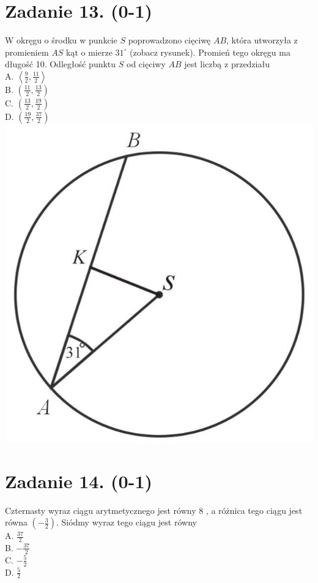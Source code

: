 \documentclass[10pt]{article}
\begin{document}
\section*{Zadanie 13. (0-1)}
W okręgu o środku w punkcie \(S\) poprowadzono cięciwę \(A B\), która utworzyła z promieniem \(A S\) kąt o mierze \(31^{\circ}\) (zobacz rysunek). Promień tego okręgu ma długość 10. Odległość punktu \(S\) od cięciwy \(A B\) jest liczbą z przedziału\\
A. \(\left\langle\frac{9}{2}, \frac{11}{2}\right\rangle\)\\
B. \(\left(\frac{11}{2}, \frac{13}{2}\right)\)\\
C. \(\left(\frac{13}{2}, \frac{19}{2}\right)\)\\
D. \(\left(\frac{19}{2}, \frac{37}{2}\right)\)\\
\includegraphics[max width=\textwidth, center]{2024_11_21_1c92fcc0db78c9202015g-06}

\section*{Zadanie 14. (0-1)}
Czternasty wyraz ciągu arytmetycznego jest równy 8 , a różnica tego ciągu jest równa \(\left(-\frac{3}{2}\right)\). Siódmy wyraz tego ciągu jest równy\\
A. \(\frac{37}{2}\)\\
B. \(-\frac{37}{2}\)\\
C. \(-\frac{5}{2}\)\\
D. \(\frac{5}{2}\)
\end{document}

